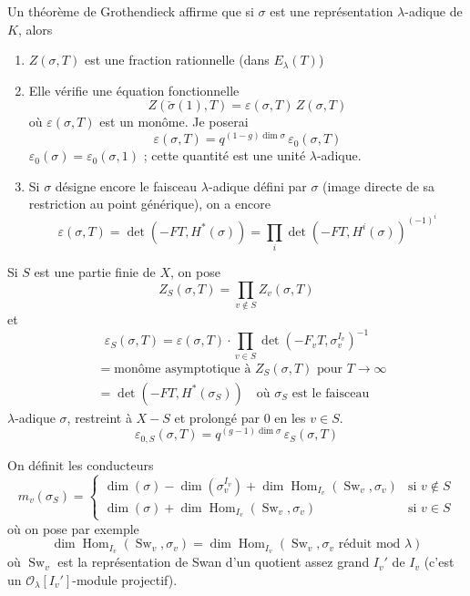 \documentclass[11pt,a4paper]{article}
\theoremstyle{plain}
\DeclareMathOperator{\Hom}{Hom}
\DeclareMathOperator{\Sw}{Sw}
\begin{document}
Un th\'eor\`eme de Grothendieck affirme que si $\sigma$ est une repr\'esentation $\lambda$-adique de $K$, alors

\begin{enumerate}[label=\alph*)]
\item $Z(\sigma, T)$ est une fraction rationnelle (dans $E_\lambda(T)$)
\item Elle v\'erifie une \'equation fonctionnelle
\[
Z(\check{\sigma}(1), T) = \varepsilon(\sigma, T) \, Z(\sigma, T)
\]
o\`u $\varepsilon(\sigma, T)$ est un mon\^ome. Je poserai
\[
\varepsilon(\sigma, T) = q^{(1-g)\dim \sigma} \, \varepsilon_0(\sigma, T)
\]
$\varepsilon_0(\sigma) = \varepsilon_0(\sigma, 1)$ ; cette quantit\'e est une unit\'e $\lambda$-adique.
\item Si $\sigma$ d\'esigne encore le faisceau $\lambda$-adique d\'efini par $\sigma$ (image directe de sa restriction au point g\'en\'erique), on a encore
\[
\varepsilon(\sigma, T) = \det(-FT, H^*(\sigma)) = \prod_i \det(-FT, H^i(\sigma))^{(-1)^i}
\]
\end{enumerate}

\newpage

Si $S$ est une partie finie de $X$, on pose
\[
Z_S(\sigma, T) = \prod_{v \notin S} Z_v(\sigma, T)
\]
et
\[
\varepsilon_S(\sigma, T) = \varepsilon(\sigma, T) \cdot \prod_{v \in S} \det(-F_v T, \sigma_v^{I_v})^{-1}
\]
\begin{align*}
&= \text{mon\^ome asymptotique \`a } Z_S(\sigma, T) \text{ pour } T \to \infty \\
&= \det(-FT, H^*(\sigma_S)) \quad \text{o\`u } \sigma_S \text{ est le faisceau}
\end{align*}
$\lambda$-adique $\sigma$, restreint \`a $X - S$ et prolong\'e par $0$ en les $v \in S$.
\[
\varepsilon_{0,S}(\sigma, T) = q^{(g-1)\dim \sigma} \, \varepsilon_S(\sigma, T)
\]

On d\'efinit les conducteurs
\[
m_v(\sigma_S) = \begin{cases}
\dim(\sigma) - \dim(\sigma_v^{I_v}) + \dim \Hom_{I_v}(\Sw_v, \sigma_v) & \text{si } v \notin S \\[6pt]
\dim(\sigma) + \dim \Hom_{I_v}(\Sw_v, \sigma_v) & \text{si } v \in S
\end{cases}
\]
o\`u on pose par exemple
\[
\dim \Hom_{I_v}(\Sw_v, \sigma_v) = \dim \Hom_{I_v}(\Sw_v, \sigma_v \text{ r\'eduit mod } \lambda)
\]
o\`u $\Sw_v$ est la repr\'esentation de Swan d'un quotient assez grand $I_v'$ de $I_v$ (c'est un $\mathcal{O}_\lambda[I_v']$-module projectif).
\end{document}

